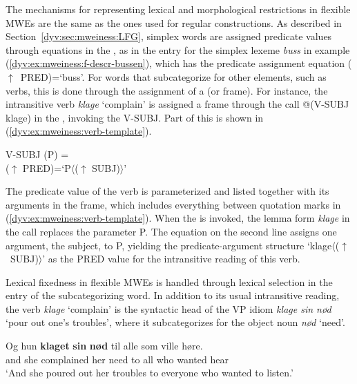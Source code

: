 \documentclass[output=paper]{langsci/langscibook}
\begin{document}
The mechanisms for representing lexical and morphological restrictions in flexible MWEs are the same as the ones used for regular constructions.
As described in Section~\ref{dyv:sec:mweiness:LFG}, simplex words are assigned predicate values through equations in the , as in the entry for the simplex lexeme \emph{buss} in example (\ref{dyv:ex:mweiness:f-descr-bussen}), which has the predicate assignment equation \textsf{($\uparrow$~PRED)=`buss'}. 
For words that subcategorize for other elements, such as verbs, this is done through the assignment of a  (or  frame). 
For instance, the intransitive verb \emph{klage} `complain' is assigned a frame through the  call \textsf{@(V-SUBJ klage)} in the , invoking the  \textsf{V-SUBJ}. 
Part of this  is shown in (\ref{dyv:ex:mweiness:verb-template}).

\ea\label{dyv:ex:mweiness:verb-template}
{\sffamily 
 V-SUBJ (P) = \\
\hspace{2em} ($\uparrow$ PRED)=`P$\langle$($\uparrow$ SUBJ)$\rangle$' \\
}
\z

The predicate value of the verb is parameterized and listed together with its arguments in the  frame, which includes everything between quotation marks in (\ref{dyv:ex:mweiness:verb-template}).
When the  is invoked, the lemma form \emph{klage} in the  call replaces the parameter \textsf{P}. 
The equation on the second line assigns one argument, the subject, to \textsf{P}, yielding the predicate-argument  structure \textsf{`klage$\langle$($\uparrow$~SUBJ)$\rangle$'} as the \textsf{PRED} value for the intransitive reading of this verb.


Lexical fixedness in flexible MWEs is handled through lexical selection in the entry of the subcategorizing word. 
In addition to its usual intransitive reading, the verb \emph{klage} `complain' is the syntactic head of the VP idiom \emph{klage sin nød} `pour out one's troubles', where it subcategorizes for the object noun \emph{nød} `need'. 

 \ea\label{dyv:ex:mweiness:klagesinnød}
\gll Og hun \textbf{klaget} \textbf{sin} \textbf{nød} til alle som ville høre. \\
     and she complained her need to all who wanted hear \\
\glt `And she poured out her troubles to everyone who wanted to listen.’
\z
\end{document}
